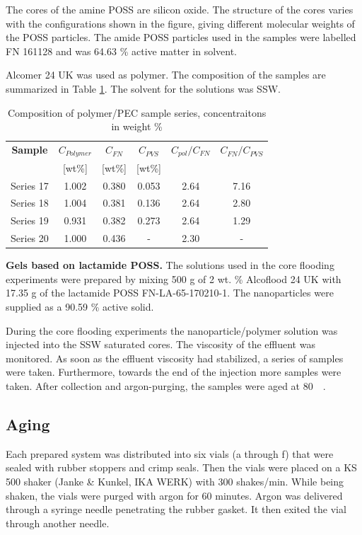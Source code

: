 \documentclass[journal = enfuem, manuscript =  article]{achemso}
\begin{document}
The cores of the amine POSS are silicon oxide. The structure of the cores varies with the configurations shown in the figure, giving different molecular weights of the POSS particles. The amide POSS particles used in the samples were labelled FN 161128 and was 64.63 \% active matter in solvent.

Alcomer 24 UK was used as polymer. The composition of the samples are summarized in Table \ref{tab:polyPecComp}. The solvent for the solutions was SSW.

\begin{table} 

\centering
\caption{Composition of polymer/PEC sample series, concentraitons in weight \%}
\label{tab:polyPecComp}
\begin{tabular}{c c c c c c } 
\toprule
\textbf{Sample} & \textbf{$C_{Polymer}$} & \textbf{$C_{FN}$} & \textbf{$C_{PVS}$} & \textbf{$C_{pol}/C_{FN}$} & \textbf{$C_{FN}/C_{PVS}$} \\ 
&[wt\%]& [wt\%] & [wt\%] && \\
\midrule 
Series 17   & 1.002   & 0.380 & 0.053 & 2.64 & 7.16\\
Series 18   & 1.004   & 0.381 & 0.136 & 2.64 & 2.80\\ 
Series 19   & 0.931   & 0.382 & 0.273 & 2.64 & 1.29\\ 
Series 20   & 1.000   & 0.436 & - & 2.30     & - \\
\bottomrule
\end{tabular}
\end{table}

\textbf{Gels based on lactamide POSS.}
The solutions used in the core flooding experiments were prepared by mixing 500 g of 2 wt. \% Alcoflood 24 UK with 17.35 g of the lactamide POSS FN-LA-65-170210-1. The nanoparticles were supplied as a 90.59 \% active solid.

During the core flooding experiments the nanoparticle/polymer solution was injected into the SSW saturated cores. The viscosity of the effluent was monitored. As soon as the effluent viscosity had stabilized, a series of samples were taken. Furthermore, towards the end of the injection more samples were taken. After collection and argon-purging, the samples were aged at 80~\celsius~. 


\subsection{Aging}
Each prepared system was distributed into six vials (a through f) that were sealed with rubber stoppers and crimp seals. Then the vials were placed on a KS 500 shaker (Janke \& Kunkel, IKA WERK) with 300 shakes/min. While being shaken, the vials were purged with argon for 60 minutes. Argon was delivered through a syringe needle penetrating the rubber gasket. It then exited the vial through another needle.
\end{document}
